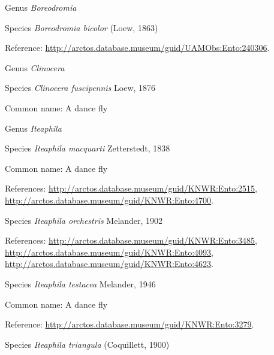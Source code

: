 \documentclass[9pt, article]{memoir}
\begin{document}
\begin{multicols}{2}
\vspace{6pt}\noindent\hspace{30pt}Genus \textit{Boreodromia}


\vspace{6pt}\noindent\hspace{36pt}Species \textit{Boreodromia bicolor} (Loew, 1863)


Reference: 
\url{http://arctos.database.museum/guid/UAMObs:Ento:240306}.

\vspace{6pt}\noindent\hspace{30pt}Genus \textit{Clinocera}


\vspace{6pt}\noindent\hspace{36pt}Species \textit{Clinocera fuscipennis} Loew, 1876


Common name: A dance fly

\vspace{6pt}\noindent\hspace{30pt}Genus \textit{Iteaphila}


\vspace{6pt}\noindent\hspace{36pt}Species \textit{Iteaphila macquarti} Zetterstedt, 1838


Common name: A dance fly

References: 
\url{http://arctos.database.museum/guid/KNWR:Ento:2515}, 
\url{http://arctos.database.museum/guid/KNWR:Ento:4700}.

\vspace{6pt}\noindent\hspace{36pt}Species \textit{Iteaphila orchestris} Melander, 1902


References: 
\url{http://arctos.database.museum/guid/KNWR:Ento:3485}, 
\url{http://arctos.database.museum/guid/KNWR:Ento:4093}, 
\url{http://arctos.database.museum/guid/KNWR:Ento:4623}.

\vspace{6pt}\noindent\hspace{36pt}Species \textit{Iteaphila testacea} Melander, 1946


Common name: A dance fly

Reference: 
\url{http://arctos.database.museum/guid/KNWR:Ento:3279}.

\vspace{6pt}\noindent\hspace{36pt}Species \textit{Iteaphila triangula} (Coquillett, 1900)



\end{multicols}
\end{document}

